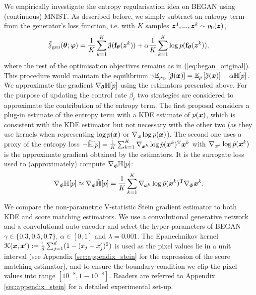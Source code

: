 We empirically investigate the entropy regularisation idea on BEGAN using (continuous) MNIST. 
As described before, we simply subtract an entropy term from the generator's loss function, i.e. with $K$ samples $\bm{z}^1, ..., \bm{z}^k \sim p_0(\bm{z})$,
\begin{equation}
\tilde{\mathcal{J}}_{\text{gen}}(\bm{\theta}; \bm{\varphi}) = \frac{1}{K} \sum_{k=1}^K \mathcal{J}(\mathbf{f}_{\bm{\theta}}(\bm{z}^k)) + \alpha \frac{1}{K} \sum_{k=1}^K \log p(\mathbf{f}_{\bm{\theta}}(\bm{z}^k)),
\end{equation}
where the rest of the optimisation objectives remains as in (\ref{eq:began_original}). This procedure would maintain the equilibrium $\gamma \mathbb{E}_{p_{\mathcal{D}}} \left[ \mathcal{J}(\bm{x}) \right] = \mathbb{E}_{p} \left[ \mathcal{J}(\bm{x}) \right] - \alpha \mathbb{H}[p]$. We approximate the gradient $\nabla_{\bm{\theta}} \mathbb{H}[p]$ using the estimators presented above. For the purpose of updating the control rate $\beta_t$ two strategies are considered to approximate the contribution of the entropy term. The first proposal considers a plug-in estimate of the entropy term with a KDE estimate of $p(\bm{x})$, which is consistent with the KDE estimator but not necessary with the other two (as they use kernels when representing $\log p(\bm{x})$ or $\nabla_{\bm{x}} \log p(\bm{x})$). The second one uses a proxy of the entropy loss $-\tilde{\mathbb{H}}[p] = \frac{1}{K} \sum_{k=1}^K \nabla_{\bm{x}^k} \log \hat{p}(\bm{x}^k)^{\text{T}} \bm{x}^k$ with $\nabla_{\bm{x}^k} \log \hat{p}(\bm{x}^k)$ is the approximate gradient obtained by the estimators. It is the surrogate loss used to (approximately) compute $\nabla_{\bm{\phi}} \mathbb{H}[p]$:
$$
\nabla_{\bm{\phi}} \mathbb{H}[p] \approx \nabla_{\bm{\phi}} \tilde{\mathbb{H}}[p] = \frac{1}{K} \sum_{k=1}^K \nabla_{\bm{x}^k} \log \hat{p}(\bm{x}^k)^{\text{T}} \nabla_{\bm{\phi}} \bm{x}^k.
$$

We compare the non-parametric V-statistic Stein gradient estimator to both KDE and score matching estimators. We use a convolutional generative network and a convolutional auto-encoder and select the hyper-parameters of BEGAN $\gamma \in \{0.3, 0.5, 0.7\}$, $\alpha \in [0, 1]$ and $\lambda = 0.001$. The Epanechnikov kernel $\mathcal{K}(\bm{x}, \bm{x}') := \frac{1}{d} \sum_{j=1}^d (1 - (x_j - x'_j)^2)$ is used as the pixel values lie in a unit interval (see Appendix \ref{sec:appendix_stein} for the expression of the score matching estimator), and to ensure the boundary condition we clip the pixel values into range $[10^{-8}, 1-10^{-8}]$. Readers are referred to Appendix \ref{sec:appendix_stein} for a detailed experimental set-up.

